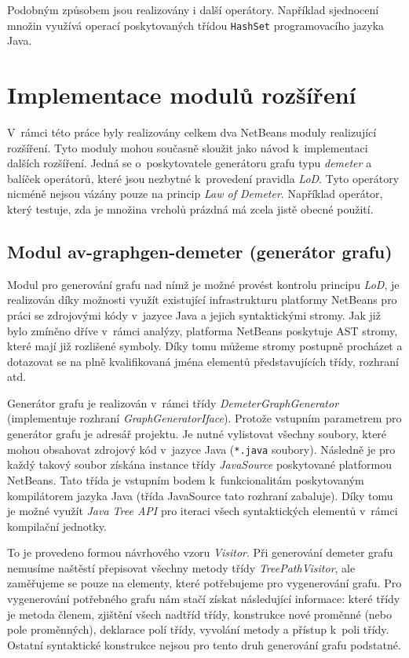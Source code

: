 Podobným způsobem jsou realizovány i další operátory. Například sjednocení množin využívá operací poskytovaných třídou \verb-HashSet- programovacího jazyka Java.

\section{Implementace modulů rozšíření}
V~rámci této práce byly realizovány celkem dva NetBeans moduly realizující rozšíření. Tyto moduly mohou současně sloužit jako návod k~implementaci dalších rozšíření. Jedná se o~poskytovatele generátoru grafu typu \emph{demeter} a balíček operátorů, které jsou nezbytné k~provedení pravidla \emph{LoD}. Tyto operátory nicméně nejsou vázány pouze na princip \emph{Law of Demeter}. Například operátor, který testuje, zda je množina vrcholů prázdná má zcela jistě obecné použití.

\subsection{Modul av-graphgen-demeter (generátor grafu)}
Modul pro generování grafu nad nímž je možné provést kontrolu principu \emph{LoD}, je realizován díky možnosti využít existující infrastrukturu platformy NetBeans pro práci se zdrojovými kódy v~jazyce Java a jejich syntaktickými stromy. Jak již bylo zmíněno dříve v~rámci analýzy, platforma NetBeans poskytuje AST stromy, které mají již rozlišené symboly. Díky tomu můžeme stromy postupně procházet a dotazovat se na plně kvalifikovaná jména elementů představujících třídy, rozhraní atd.

Generátor grafu je realizován v~rámci třídy \emph{DemeterGraphGenerator} (implementuje rozhraní \emph{GraphGeneratorIface}). Protože vstupním parametrem pro generátor grafu je  adresář projektu. Je nutné vylistovat všechny soubory, které mohou obsahovat zdrojový kód v~jazyce Java (\verb+*.java+ soubory). Následně je pro každý takový soubor získána instance třídy \emph{JavaSource} poskytované platformou NetBeans. Tato třída je vstupním bodem k~funkcionalitám poskytovaným kompilátorem jazyka Java (třída JavaSource tato rozhraní zabaluje). Díky tomu je možné využít \emph{Java Tree API} pro iteraci všech syntaktických elementů v~rámci kompilační jednotky.

To je provedeno formou návrhového vzoru \emph{Visitor}. Při generování demeter grafu nemusíme naštěstí přepisovat všechny metody třídy \emph{TreePathVisitor}, ale zaměřujeme se pouze na elementy, které potřebujeme pro vygenerování grafu. Pro vygenerování potřebného grafu nám stačí získat následující informace: které třídy je metoda členem, zjištění všech nadtříd třídy, konstrukce nové proměnné (nebo pole proměnných), deklarace polí třídy, vyvolání metody a přístup k~poli třídy. Ostatní syntaktické konstrukce nejsou pro tento druh generování grafu podstatné.

